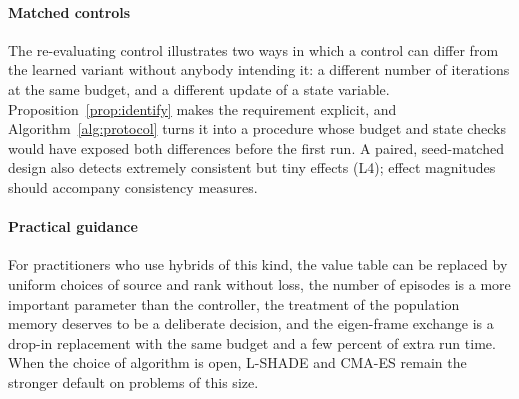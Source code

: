 \paragraph{Matched controls} The re-evaluating control illustrates two ways in which a control can differ from the learned variant
without anybody intending it: a different number of iterations at the same budget, and a different update of a state
variable. Proposition~\ref{prop:identify} makes the requirement explicit, and Algorithm~\ref{alg:protocol} turns it into a
procedure whose budget and state checks would have exposed both differences before the first run. A paired, seed-matched
design also detects extremely consistent but tiny effects (L4); effect magnitudes should accompany consistency measures.

\paragraph{Practical guidance} For practitioners who use hybrids of this kind, the value table can be replaced by uniform
choices of source and rank without loss, the number of episodes is a more important parameter than the controller, the
treatment of the population memory deserves to be a deliberate decision, and the eigen-frame exchange is a drop-in
replacement with the same budget and a few percent of extra run time. When the choice of algorithm is open, L-SHADE and
CMA-ES remain the stronger default on problems of this size.

